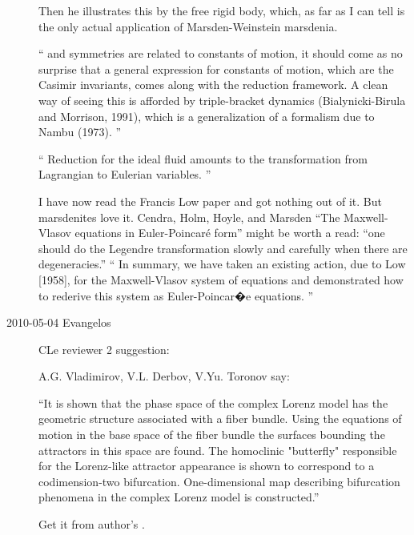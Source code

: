 \begin{description}
Then he illustrates this by the free rigid body, which, as far as I can
tell is the only actual application of Marsden-Weinstein marsdenia.

``
and symmetries are related to constants of motion, it
should come as no surprise that a general expression for
constants of motion, which are the Casimir invariants,
comes along with the reduction framework. A clean way
of seeing this is afforded by triple-bracket dynamics
(Bialynicki-Birula and Morrison, 1991), which is a generalization
of a formalism due to Nambu (1973).
''

``
Reduction for the ideal fluid
amounts to the transformation from Lagrangian to Eulerian
variables.
''

I have now read the  Francis Low paper and got nothing out
of it. But marsdenites love it.
Cendra, Holm, Hoyle, and Marsden
``The {Maxwell-Vlasov} equations in {Euler-Poincar\'e} form'' might
be worth a read:
``one should do the Legendre transformation slowly and
carefully when there are degeneracies.''
``
In summary, we have taken an existing action, due to Low [1958], for the
Maxwell-Vlasov system of equations and demonstrated how to rederive this system
as Euler-Poincar�e equations.
''


\item[2010-05-04 Evangelos] CLe reviewer 2 suggestion:

A.G. Vladimirov, V.L. Derbov, V.Yu. Toronov
say:

``It is shown that the phase space of the complex Lorenz
model has the geometric structure associated with a fiber
bundle. Using the equations of motion in the base space of
the fiber bundle the surfaces bounding the attractors in this
space are found. The homoclinic "butterfly" responsible for
the Lorenz-like attractor appearance is shown to correspond
to a codimension-two bifurcation. One-dimensional map
describing bifurcation phenomena in the complex Lorenz model
is constructed.''

Get it from author's
.


\end{description}
